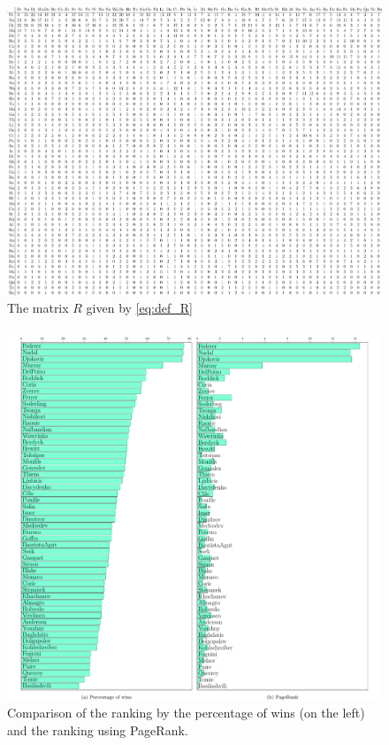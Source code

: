 \documentclass[11pt,nocut]{article}
\begin{document}
\begin{figure}
    \centering
	\hspace*{-2cm}
	\includegraphics[width=1.23\textwidth]{./confrontations.pdf}
	\caption{The matrix $R$ given by \eqref{eq:def_R}}
	\label{fig:confrontations}
\end{figure}
\begin{figure}
    \centering
	\hspace*{-2cm}
	\includegraphics[width=1.23\textwidth]{./pagerank_tennis.pdf}
	\caption{Comparison of the ranking by the percentage of wins (on the left) and the ranking using PageRank.}
	\label{fig:ranking}
\end{figure}


\vspace{1cm}
\centerline{}

%
%
\end{document}
